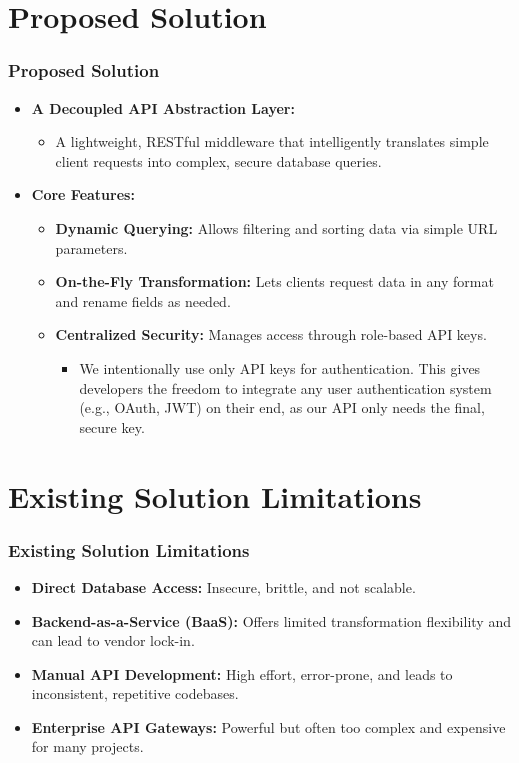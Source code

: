 \documentclass{beamer}
\begin{document}
\section{Proposed Solution}
\begin{frame}
  \frametitle{Proposed Solution}
  \begin{itemize}
    \item \textbf{A Decoupled API Abstraction Layer:}
    \begin{itemize}
        \item A lightweight, RESTful middleware that intelligently translates simple client requests into complex, secure database queries.
    \end{itemize}
    \pause
    \item \textbf{Core Features:}
    \begin{itemize}
        \item \textbf{Dynamic Querying:} Allows filtering and sorting data via simple URL parameters.
        \item \textbf{On-the-Fly Transformation:} Lets clients request data in any format and rename fields as needed.
        \pause
        \item \textbf{Centralized Security:} Manages access through role-based API keys.
        \begin{itemize}
             \item \small We intentionally use only API keys for authentication. This gives developers the freedom to integrate any user authentication system (e.g., OAuth, JWT) on their end, as our API only needs the final, secure key.
        \end{itemize}
    \end{itemize}
  \end{itemize}
\end{frame}

\section{Existing Solution Limitations}
\begin{frame}
  \frametitle{Existing Solution Limitations}
    \begin{itemize}
        \item \textbf{Direct Database Access:} Insecure, brittle, and not scalable.
        \pause
        \item \textbf{Backend-as-a-Service (BaaS):} Offers limited transformation flexibility and can lead to vendor lock-in.
        \pause
        \item \textbf{Manual API Development:} High effort, error-prone, and leads to inconsistent, repetitive codebases.
        \pause
        \item \textbf{Enterprise API Gateways:} Powerful but often too complex and expensive for many projects.
    \end{itemize}
\end{frame}
\end{document}
